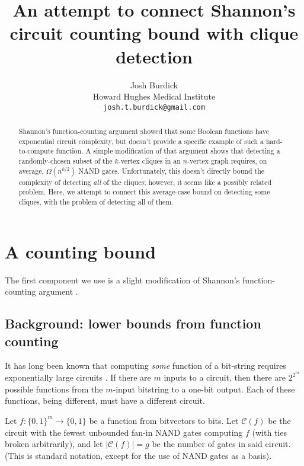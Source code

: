 \documentclass[12pt]{article}
\theoremstyle{definition}
\newcommand{\bigC}[0]{\mathcal{C}}
\begin{document}
\title{
An attempt to connect Shannon's
circuit counting bound with clique detection}

\author{Josh Burdick \\
Howard Hughes Medical Institute \\
{\tt josh.t.burdick@gmail.com}}
\maketitle

\begin{abstract}
Shannon's function-counting argument
\cite{shannon_synthesis_1949} showed that some Boolean functions have
exponential circuit complexity, but doesn't provide a specific example
of such a hard-to-compute function. A simple modification of that argument
shows that detecting a randomly-chosen subset of the $k$-vertex cliques in an
$n$-vertex graph requires, on average, $\Omega(n^{k/2})$ NAND gates.
Unfortunately,
this doesn't directly bound the complexity of detecting {\em all} of the cliques; however, it seems like a
possibly related problem.
Here, we attempt to connect this
average-case bound on detecting some
cliques, with the problem of detecting all of them.
\end{abstract}

\newpage

\tableofcontents

\section{A counting bound}
\label{countingBound}

The first component we use is a slight modification
of Shannon's function-counting argument
\cite{shannon_synthesis_1949}.

\subsection{Background: lower bounds from function counting}

It has long been known that computing {\em some} function of a bit-string
requires exponentially large circuits \cite{shannon_synthesis_1949}.
If there are $m$ inputs to a circuit,
then there are $2^{2^m}$ possible functions from the $m$-input bitstring to
a one-bit output. Each of these functions, being different, must have a
different circuit.

Let $f: \{0,1\}^m \rightarrow \{0,1\}$ be a function from bitvectors to bits.
Let $\bigC(f)$ be the circuit
with the fewest unbounded fan-in NAND
gates computing $f$ (with ties broken
arbitrarily), and let $|\bigC(f)| = g$ be the number of gates in
said circuit. (This is standard notation, except for the use
of NAND gates as a basis). 
\end{document}
